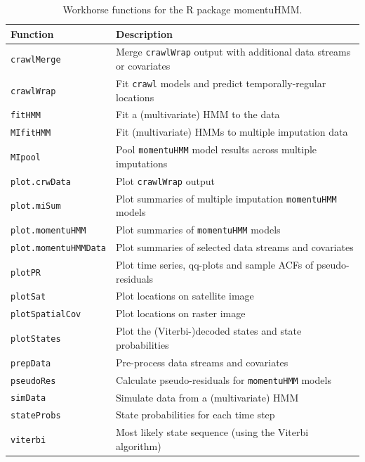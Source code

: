 \documentclass[12pt]{article}\usepackage[]{graphicx}\usepackage[]{color}
\begin{document}



\clearpage

\begin{table}
  \caption{\label{tab:functions} Workhorse functions for the R package momentuHMM.}
  \begin{tabular}{ll}
  \toprule
  Function & Description \tabularnewline
  \midrule
  \verb|crawlMerge| & Merge \verb|crawlWrap| output with additional data streams or covariates  \tabularnewline 
  \verb|crawlWrap| & Fit \verb|crawl| models and predict temporally-regular locations  \tabularnewline  
  \verb|fitHMM| & Fit a (multivariate) HMM to the data  \tabularnewline  
  \verb|MIfitHMM| & Fit (multivariate) HMMs to multiple imputation data  \tabularnewline  
  \verb|MIpool| & Pool \verb|momentuHMM| model results across multiple imputations  \tabularnewline 
  \verb|plot.crwData| & Plot \verb|crawlWrap| output \tabularnewline 
  \verb|plot.miSum| & Plot summaries of multiple imputation \verb|momentuHMM| models  \tabularnewline 
  \verb|plot.momentuHMM| & Plot summaries of \verb|momentuHMM| models  \tabularnewline 
  \verb|plot.momentuHMMData| & Plot summaries of selected data streams and covariates  \tabularnewline 
  \verb|plotPR| & Plot time series, qq-plots and sample ACFs of pseudo-residuals \tabularnewline 
  \verb|plotSat| & Plot locations on satellite image \tabularnewline   
  \verb|plotSpatialCov| & Plot locations on raster image \tabularnewline   
  \verb|plotStates| & Plot the (Viterbi-)decoded states and state probabilities \tabularnewline 
  \verb|prepData| & Pre-process data streams and covariates \tabularnewline 
  \verb|pseudoRes| & Calculate pseudo-residuals for \verb|momentuHMM| models \tabularnewline 
  \verb|simData| & Simulate data from a (multivariate) HMM \tabularnewline 
  \verb|stateProbs| & State probabilities for each time step \tabularnewline 
  \verb|viterbi| & Most likely state sequence (using the Viterbi algorithm)  \tabularnewline  
  \bottomrule
  \end{tabular}
\end{table}
\end{document}
